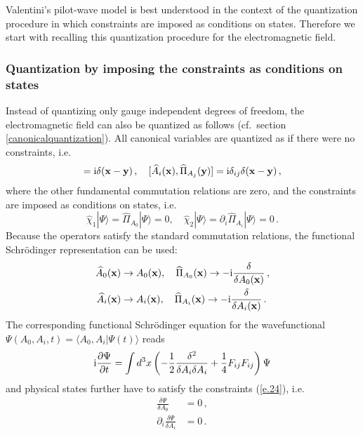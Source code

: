 \documentclass[12pt]{article}
\def\la{\langle}
\def\ra{\rangle}
\def\ii{\textrm i}
\begin{document}
Valentini's pilot-wave model is best understood in the context of the quantization procedure in which constraints are imposed as conditions on states. Therefore we start with recalling this quantization procedure for the electromagnetic field.

\subsubsection{Quantization by imposing the constraints as conditions on states}
Instead of quantizing only gauge independent degrees of freedom, the electromagnetic field can also be quantized as follows (cf.\ section \ref{canonicalquantization}). All canonical variables are quantized as if there were no constraints, i.e.\ 
\begin{equation}
[{\widehat A}_{0}({\bf x}),{\widehat \Pi}_{A_{0}}({\bf y})] = \ii \delta({\bf x} - {\bf y})\,, \quad {[{\widehat A}_{i}({\bf x}),{\widehat \Pi}_{A_{j}}({\bf y})]} = \ii \delta_{ij}\delta({\bf x} - {\bf y})\,,
\label{e.23}
\end{equation}
where the other fundamental commutation relations are zero, and the constraints are imposed as conditions on states, i.e.\
\begin{equation}
{\widehat \chi}_1 |\Psi \rangle = {\widehat \Pi}_{A_{0}}|\Psi \rangle = 0, \quad {\widehat \chi}_2 |\Psi \rangle =\partial_i {\widehat \Pi}_{A_{i}}|\Psi \rangle = 0\,.  
\label{e.24}
\end{equation}
Because the operators satisfy the standard commutation relations, the functional Schr{\"o}\-ding\-er representation can be used:
\begin{align}
{\widehat A}_{0}({\bf x}) &\to A_{0} ({\bf x}),\quad {\widehat \Pi}_{A_{0} }({\bf x}) \to -\ii\frac{\delta}{\delta A_{0} ({\bf x})}\,, \nonumber\\
{\widehat A}_{i}({\bf x}) &\to A_{i} ({\bf x}),\quad {\widehat \Pi}_{A_{i} }({\bf x}) \to -\ii\frac{\delta}{\delta A_{i} ({\bf x})}\,.
\label{e.25}
\end{align}
The corresponding functional Schr\"o\-ding\-er equation for the wave\-func\-tion\-al $\Psi(A_{0},A_i,t)=\la A_{0},A_i|\Psi(t)\ra$ reads 
\begin{equation}
\ii\frac{\partial \Psi}{\partial t}= \int d^3 x \left( -\frac{1}{2}\frac{\delta^2}{\delta  A_{i}\delta  A_{i}} + \frac{1}{4}F_{ij}F_{ij}  \right)\Psi 
\label{e.26}
\end{equation}
and physical states further have to satisfy the constraints ({\ref{e.24}}), i.e.\ 
\begin{align}
\frac{\delta \Psi}{\delta  A_{0}}&=0\,, \label{e.27}\\
\partial_i \frac{\delta \Psi}{\delta  A_{i}}&=0\,.
\label{e.28}
\end{align}
\end{document}
